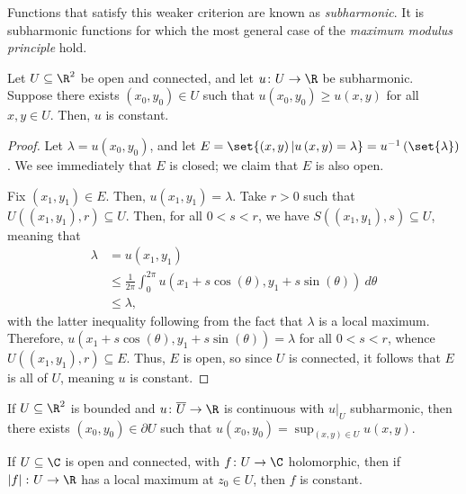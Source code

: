 \documentclass[10pt]{mypackage}
\begin{document}
Functions that satisfy this weaker criterion are known as \textit{subharmonic}. It is subharmonic functions for which the most general case of the \textit{maximum modulus principle} hold.
\begin{theorem}
  Let $U\subseteq \R^{2}$ be open and connected, and let $u\colon U\rightarrow \R$ be subharmonic. Suppose there exists $\left( x_0,y_0 \right)\in U$ such that $u\left( x_0,y_0 \right)\geq u\left( x,y \right)$ for all $x,y\in U$. Then, $u$ is constant.
\end{theorem}
\begin{proof}
  Let $\lambda = u\left( x_0,y_0 \right)$, and let $E = \set{\left( x,y \right) | u\left( x,y \right) = \lambda} = u^{-1}\left( \set{\lambda} \right)$. We see immediately that $E$ is closed; we claim that $E$ is also open.\newline

  Fix $\left( x_1,y_1 \right)\in E$. Then, $u\left( x_1,y_1 \right) = \lambda$. Take $r > 0$ such that $U\left( \left( x_1,y_1 \right),r \right)\subseteq U$. Then, for all $0 < s < r$, we have $S\left( \left( x_1,y_1 \right),s \right)\subseteq U$, meaning that
  \begin{align*}
    \lambda &= u\left( x_1,y_1 \right) \\
            &\leq \frac{1}{2\pi} \int_{0}^{2\pi} u\left( x_1 + s\cos\left( \theta \right),y_1+s\sin\left( \theta \right) \right)\:d\theta\\
            &\leq \lambda,
  \end{align*}
  with the latter inequality following from the fact that $\lambda$ is a local maximum. Therefore, $u\left( x_1 + s\cos\left( \theta \right),y_1 + s\sin\left( \theta \right) \right) = \lambda$ for all $0 < s < r$, whence $U\left( \left( x_1,y_1 \right),r \right)\subseteq E$. Thus, $E$ is open, so since $U$ is connected, it follows that $E$ is all of $U$, meaning $u$ is constant.
\end{proof}
\begin{corollary}
  If $U\subseteq \R^2$ is bounded and $u\colon \overline{U}\rightarrow \R$ is continuous with $u|_{U}$ subharmonic, then there exists $\left( x_0,y_0 \right)\in \partial U$ such that $u\left( x_0,y_0 \right) = \sup_{\left( x,y \right)\in U} u\left( x,y \right)$.
\end{corollary}
\begin{corollary}
  If $U\subseteq \C$ is open and connected, with $f\colon U\rightarrow \C$ holomorphic, then if $\left\vert f \right\vert\colon U\rightarrow \R$ has a local maximum at $z_0\in U$, then $f$ is constant.
\end{corollary}
\end{document}
